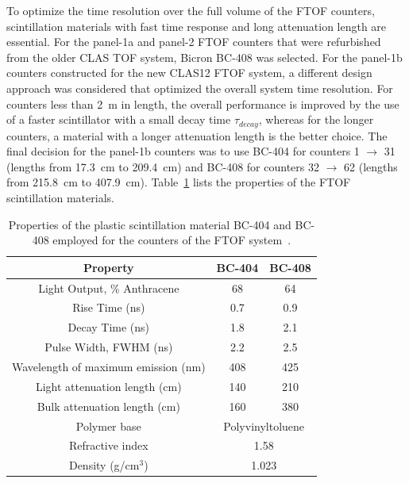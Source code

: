 \documentclass[final,3p,twocolumn]{elsarticle}
\begin{document}
To optimize the time resolution over the full volume of the FTOF counters, scintillation materials with
fast time response and long attenuation length are essential. For the panel-1a and panel-2 FTOF counters
that were refurbished from the older CLAS TOF system, Bicron BC-408 was selected. For the panel-1b
counters constructed for the new CLAS12 FTOF system, a different design approach was considered
that optimized the overall system time resolution. For counters less than 2~m in length, the overall
performance is improved by the use of a faster scintillator with a small decay time $\tau_{decay}$, whereas
for the longer counters, a material with a longer attenuation length is the better choice. The final decision
for the panel-1b counters was to use BC-404 for counters 1 $\to$ 31 (lengths from 17.3~cm to 209.4~cm)
and BC-408 for counters 32 $\to$ 62 (lengths from 215.8~cm to 407.9~cm). Table~\ref{scint-specs}
lists the properties of the FTOF scintillation materials.

\begin{table}[t]
\begin{center}
\begin{tabular}{c|c|c} \hline
Property                                    & BC-404     & BC-408  \\ \hline    
Light Output, \% Anthracene  & 68             &  64    \\ \hline
Rise Time (ns)                           & 0.7             & 0.9    \\ \hline
Decay Time (ns)                         & 1.8             & 2.1     \\ \hline
Pulse Width, FWHM (ns)         & 2.2              & 2.5    \\ \hline
Wavelength of maximum emission (nm) & 408    & 425 \\ \hline
Light attenuation length (cm)   & 140             & 210   \\ \hline
Bulk attenuation length (cm)     & 160             & 380  \\ \hline
Polymer base                             & \multicolumn{2}{c}{Polyvinyltoluene} \\ \hline
Refractive index                       & \multicolumn{2}{c}{1.58}                    \\ \hline 
Density (g/cm$^3$)                  & \multicolumn{2}{c}{1.023}                    \\ \hline 
\end{tabular}
\end{center}
\caption{Properties of the plastic scintillation material BC-404 and BC-408 employed for the counters
of the FTOF system~\cite{scint-mat-ref}.}
\label{scint-specs}
\end{table}
\end{document}

